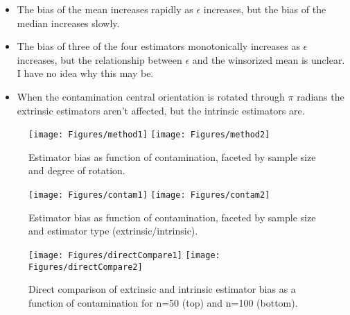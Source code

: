 \documentclass{article}\usepackage[]{graphicx}\usepackage[]{color}
\newenvironment{knitrout}{}{} %
\begin{document}
\begin{itemize}
\item The bias of the mean increases rapidly as $\epsilon$ increases, but the bias of the median increases slowly.
\item The bias of three of the four estimators monotonically increases as $\epsilon$ increases, but the relationship between $\epsilon$ and the winsorized mean is unclear.  I have no idea why this may be.
\item When the contamination central orientation is rotated through $\pi$ radians the extrinsic estimators aren't affected, but the intrinsic estimators are.
\end{itemize}
\begin{knitrout}
\color{fgcolor}\begin{figure}[h]


{\centering \texttt{[image: Figures/method1]} 
\texttt{[image: Figures/method2]} 

}

\caption[Estimator bias as  function of contamination, faceted by sample size and degree of rotation]{Estimator bias as  function of contamination, faceted by sample size and degree of rotation.\label{fig:method}}
\end{figure}


\end{knitrout}


\begin{knitrout}
\color{fgcolor}\begin{figure}[]


{\centering \texttt{[image: Figures/contam1]} 
\texttt{[image: Figures/contam2]} 

}

\caption[Estimator bias as  function of contamination, faceted by sample size and estimator type (extrinsic/intrinsic)]{Estimator bias as  function of contamination, faceted by sample size and estimator type (extrinsic/intrinsic).\label{fig:contam}}
\end{figure}


\end{knitrout}



\begin{knitrout}
\color{fgcolor}\begin{figure}[]


{\centering \texttt{[image: Figures/directCompare1]} 
\texttt{[image: Figures/directCompare2]} 

}

\caption[Direct comparison of extrinsic and intrinsic estimator bias as a function of contamination for n=50 (top) and n=100 (bottom)]{Direct comparison of extrinsic and intrinsic estimator bias as a function of contamination for n=50 (top) and n=100 (bottom).\label{fig:directCompare}}
\end{figure}


\end{knitrout}
\end{document}
